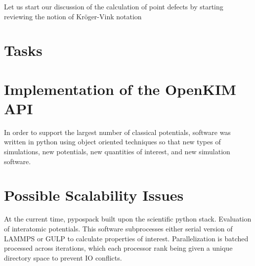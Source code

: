 Let us start our discussion of the calculation of point defects by starting reviewing the notion of Kr\"oger-Vink notation\cite{kroger1956_notation}

\section{Tasks}


\section{Implementation of the OpenKIM API}

In order to support the largest number of classical potentials, software was written in python using object oriented techniques so that new types of simulations, new potentials, new quantities of interest, and new simulation software.

\section{Possible Scalability Issues}

At the current time, pypospack built upon the scientific python stack.
Evaluation of interatomic potentials.  This software subprocesses either serial version of LAMMPS or GULP to calculate properties of interest.  Parallelization is batched processed across iterations, which each processor rank being given a unique directory space to prevent IO conflicts.

